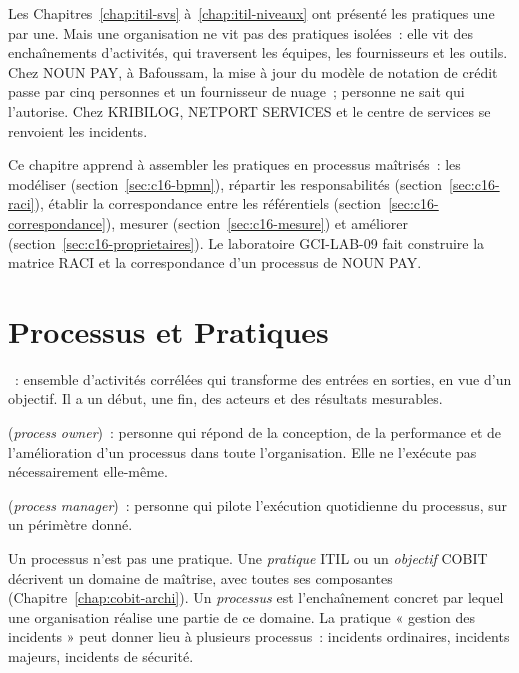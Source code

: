 Les Chapitres~\ref{chap:itil-svs} à~\ref{chap:itil-niveaux} ont présenté
les pratiques une par une. Mais une organisation ne vit pas des pratiques
isolées~: elle vit des enchaînements d'activités, qui traversent les
équipes, les fournisseurs et les outils. Chez NOUN PAY, à Bafoussam, la
mise à jour du modèle de notation de crédit passe par cinq personnes et un
fournisseur de nuage~; personne ne sait qui l'autorise. Chez KRIBILOG,
NETPORT SERVICES et le centre de services se renvoient les incidents.

Ce chapitre apprend à assembler les pratiques en processus maîtrisés~: les
modéliser (section~\ref{sec:c16-bpmn}), répartir les responsabilités
(section~\ref{sec:c16-raci}), établir la correspondance entre les
référentiels (section~\ref{sec:c16-correspondance}), mesurer
(section~\ref{sec:c16-mesure}) et améliorer (section~\ref{sec:c16-proprietaires}).
Le laboratoire GCI-LAB-09 fait construire la matrice RACI et la
correspondance d'un processus de NOUN PAY.

\separateur

\section{Processus et Pratiques}
\label{sec:c16-notions}

\begin{boxdef}
~: ensemble d'activités corrélées qui
transforme des entrées en sorties, en vue d'un objectif. Il a un début, une
fin, des acteurs et des résultats mesurables.

\medskip
{}
(\textit{process owner})~: personne qui répond de la conception, de la
performance et de l'amélioration d'un processus dans toute
l'organisation. Elle ne l'exécute pas nécessairement elle-même.

\medskip
{}
(\textit{process manager})~: personne qui pilote l'exécution quotidienne du
processus, sur un périmètre donné.
\end{boxdef}

Un processus n'est pas une pratique. Une \emph{pratique} ITIL ou un
\emph{objectif} COBIT décrivent un domaine de maîtrise, avec toutes ses
composantes (Chapitre~\ref{chap:cobit-archi}). Un \emph{processus} est
l'enchaînement concret par lequel une organisation réalise une partie de
ce domaine. La pratique « gestion des incidents » peut donner lieu à
plusieurs processus~: incidents ordinaires, incidents majeurs, incidents
de sécurité.

